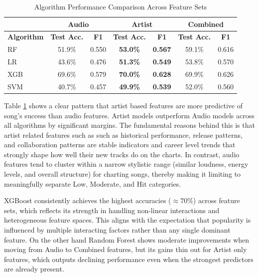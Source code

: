 \documentclass{article}
\begin{document}
\begin{table}[h!]
\centering
\footnotesize
\setlength{\tabcolsep}{6pt}
\renewcommand{\arraystretch}{1.25}

\begin{tabular}{lcccccc}
\hline
& \multicolumn{2}{c}{\textbf{Audio}} 
& \multicolumn{2}{c}{\textbf{Artist}} 
& \multicolumn{2}{c}{\textbf{Combined}} \\
\hline
\textbf{Algorithm} 
& \textbf{Test Acc.} & \textbf{F1} 
& \textbf{Test Acc.} & \textbf{F1} 
& \textbf{Test Acc.} & \textbf{F1} \\
\hline

RF  
& 51.9\% & 0.550 
& \textbf{53.0\%} & \textbf{0.567} 
& 59.1\% & 0.616 \\

LR   
& 43.6\% & 0.476 
& \textbf{51.3\%} & \textbf{0.549} 
& 53.8\% & 0.570 \\

XGB  
& 69.6\% & 0.579 
& \textbf{70.0\%} & \textbf{0.628} 
& 69.9\% & 0.626 \\

SVM  
& 40.7\% & 0.457 
& \textbf{49.9\%} & \textbf{0.539} 
& 52.0\% & 0.560 \\
\hline
\end{tabular}
\vspace{0.2cm}
\caption{Algorithm Performance Comparison Across Feature Sets}
\label{tab:algorithm_performance}
\end{table}

\vspace{-11pt}
 Table \ref{tab:algorithm_performance} shows a clear pattern that artist based features are more predictive of song's success than audio features. Artist models outperform Audio models across all algorithms by significant margins. The fundamental reasons behind this is that artist related features such as such as historical performance, release patterns, and collaboration patterns are stable indicators and career level trends that strongly shape how well their new tracks do on the charts. In contrast, audio features tend to cluster within a narrow stylistic range (similar loudness, energy levels, and overall structure) for charting songs, thereby making it limiting to meaningfully separate Low, Moderate, and Hit categories.

XGBoost consistently achieves the highest accuracies ($\approx 70\%$) across feature sets, which reflects its strength in handling non-linear interactions and heterogeneous feature spaces. This aligns with the expectation that popularity is influenced by multiple interacting factors rather than any single dominant feature. On the other hand Random Forest shows moderate improvements when moving from Audio to Combined features, but its gains thin out for Artist only features, which outputs declining performance even when the strongest predictors are already present.
\end{document}
